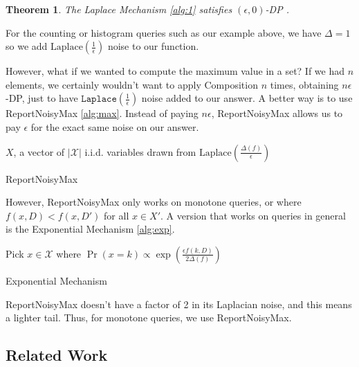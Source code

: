 \documentclass[11pt]{article}
\newtheorem{theorem}{Theorem}
\begin{document}
\begin{theorem}
The Laplace Mechanism \ref{alg:1} satisfies $(\epsilon, 0)$-DP \cite{Dwork:2006}.
\end{theorem}
For the counting or histogram queries such as our example above, we have $\Delta = 1$ so we add $\text{Laplace}\left(\frac{1}{\epsilon}\right)$ noise to our function.

However, what if we wanted to compute the maximum value in a set? If we had $n$ elements, we certainly wouldn't want to apply Composition $n$ times, obtaining $n\epsilon$-DP, just to have $\texttt{Laplace}\left(\frac{1}{\epsilon}\right)$ noise added to our answer. A better way is to use ReportNoisyMax \ref{alg:max}. Instead of paying $n\epsilon$, ReportNoisyMax allows us to pay $\epsilon$ for the exact same noise on our answer.
\begin{algorithm}\label{alg:max}
\SetAlgoLined
{}
$X$, a vector of $|\mathcal{X}|$ i.i.d. variables drawn from $\text{Laplace}\left(\frac{\Delta(f)}{\epsilon}\right)$\;
\caption{ReportNoisyMax}
\end{algorithm}
However, ReportNoisyMax only works on monotone queries, or where $f(x, D) < f(x, D')$ for all $x \in X'$. A version that works on queries in general is the Exponential Mechanism \ref{alg:exp}.
\begin{algorithm}\label{alg:exp}
\SetAlgoLined
{}
Pick $x \in \mathcal{X}$ where $\Pr(x=k) \propto \exp\left(\frac{\epsilon f(k, D)}{2\Delta(f)}\right)$\;
\caption{Exponential Mechanism}
\end{algorithm}
ReportNoisyMax doesn't have a factor of 2 in its Laplacian noise, and this means a lighter tail. Thus, for monotone queries, we use ReportNoisyMax.
\subsection{Related Work}
\end{document}

